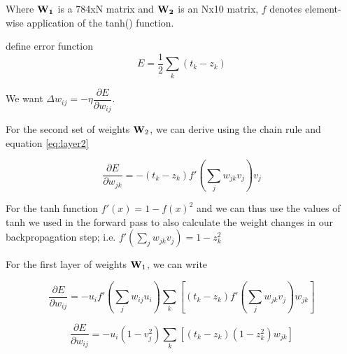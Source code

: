 \documentclass{article}
\begin{document}
Where $\bf{W}_1$ is a 784xN matrix and $\bf{W}_2$ is an Nx10 matrix, $f$ denotes element-wise application of the tanh() function.

define error function
\begin{equation}
E = \dfrac{1}{2} \sum_k{(t_k - z_k)}
\end{equation}

We want $\Delta w_{ij} = - \eta \dfrac{\partial E}{\partial w_{ij}}$. 

For the second set of weights ${\bf W}_2$, we can derive using the chain rule and equation \ref{eq:layer2}

\begin{equation}
\dfrac{\partial E}{\partial w_{jk}} = -(t_k - z_k)f'(\sum_j{w_{jk}v_j})v_j
\end{equation}

For the tanh function $f'(x) = 1- f(x)^2$ and we can thus use the values of tanh we used in the forward pass to also calculate the weight changes in our backpropagation step; i.e. $f'(\sum_j{w_{jk}v_j}) = 1 - z_k^2$

For the first layer of weights ${\bf W}_1$, we can write

\begin{equation}
\dfrac{\partial E}{\partial w_{ij}} = - u_i f'(\sum_j{w_{ij}u_i}) \sum_k{[(t_k - z_k)f'(\sum_j{w_{jk}v_j})w_{jk}]}
\end{equation}

\begin{equation}
\dfrac{\partial E}{\partial w_{ij}} = - u_i (1 - v_j^2) \sum_k{[(t_k - z_k)(1 - z_k^2)w_{jk}]}
\end{equation}
\end{document}
